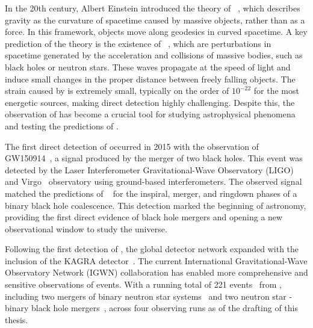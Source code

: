 In the 20th century, Albert Einstein introduced the theory of \GR~\cite{Einstein_1:1914, Einstein_2:1914, Einstein_3:1914, Einstein_4:1915, Einstein_5:1916, Einstein_6:1917, Einstein_7:1936}, which describes gravity as the curvature of spacetime caused by massive objects, rather than as a force. In this framework, objects move along geodesics in curved spacetime. A key prediction of the theory is the existence of \gws~\cite{Einstein_8:1937, Einstein_9:1938, Einstein_10:1939, Einstein_11:1948}, which are perturbations in spacetime generated by the acceleration and collisions of massive bodies, such as black holes or neutron stars. These waves propagate at the speed of light and induce small changes in the proper distance between freely falling objects. The strain caused by \gws is extremely small, typically on the order of $10^{-22}$ for the most energetic sources, making direct detection highly challenging. Despite this, the observation of \gws has become a crucial tool for studying astrophysical phenomena and testing the predictions of \GR.



The first direct detection of \gws occurred in 2015 with the observation of GW150914~\cite{GW150914:2016}, a \gwadj signal produced by the merger of two black holes. This event was detected by the Laser Interferometer Gravitational-Wave Observatory (LIGO) and Virgo~\cite{aVirgo:2015} \gwadj observatory using ground-based interferometers. The observed signal matched the predictions of \GR~\cite{GW150914_TGR:2016} for the inspiral, merger, and ringdown phases of a binary black hole coalescence. This detection marked the beginning of \gwadj astronomy, providing the first direct evidence of black hole mergers and opening a new observational window to study the universe.



Following the first detection of \gws, the global \gwadj detector network expanded with the inclusion of the KAGRA detector~\cite{KAGRA:2021}. The current International Gravitational-Wave Observatory Network (IGWN) collaboration has enabled more comprehensive and sensitive observations of \gwadj events. With a running total of 221 \gwadj events~\cite{gwtc1:2019, gwtc2:2021, gwtc21:2024, gwtc3:2023, 1OGC:2018, 2OGC:2020, 3OGC:2021, 4OGC:2021, Princeton_1:2019, Princeton_2:2019, Princeton_3a:2022, Princeton_3b:2023, gracedb_superevents:2024} from \cbcs, including two mergers of binary neutron star systems~\cite{GW170817:2017, GW190425:2020} and two neutron star - binary black hole mergers~\cite{nsbh:2021}, across four observing runs as of the drafting of this thesis.

